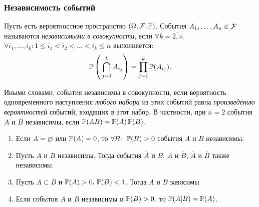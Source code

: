 \subsubsection{Независимость событий}
\begin{defn}
	Пусть есть вероятностное пространство $(\Omega, \mathcal{F}, \operatorname{\mathbb{P}})$. 
	События $A_1, \ldots, A_n \in \mathcal{F}$ называются \textit{независимыми в совокупности}, если 
	$\forall k = \overline{2, n}$ $\forall i_{1}, \ldots, i_{k} \colon 1 \leqslant i_1 < i_2 < \ldots < i_k \leqslant n$ выполняется:
	\begin{equation*}
		\operatorname{\mathbb{P}}\left(\, \bigcap\limits_{j=1}^k A_{i_j}\right) = \prod\limits_{j=1}^k \operatorname{\mathbb{P}}(A_{i_j}).
	\end{equation*}
	
	Иными словами, события независимы в совокупности, если вероятность одновременного наступления \textit{любого набора} из этих событий равна \textit{произведению вероятностей} событий, входящих в этот набор. 
	В частности, при $n = 2$ события $A$ и $B$ независимы, если $\operatorname{\mathbb{P}}(AB) = \operatorname{\mathbb{P}}(A)\operatorname{\mathbb{P}}(B)$.
\end{defn}

\begin{namedthm}\leavevmode
	\begin{enumerate}
		\item 
		      Если $A = \varnothing$ или $\operatorname{\mathbb{P}}(A) = 0$, то $\forall B \colon \operatorname{\mathbb{P}}(B) > 0$ события $A$ и $B$ независимы.
		\item 
		      Пусть $A$ и $B$ независимы. Тогда события $\overline{A}$ и $B$, $A$ и $\overline{B}$, $\overline{A}$ и $\overline{B}$ также независимы. 
		\item 
		      Пусть $A \subset B$ и $\operatorname{\mathbb{P}}(A) > 0, \, \operatorname{\mathbb{P}}(B) < 1$. Тогда $A$ и $B$ зависимы. 
		\item 
		      Если события $A$ и $B$ независимы и $\operatorname{\mathbb{P}}(B) > 0$, то $\operatorname{\mathbb{P}}(A|B) = \operatorname{\mathbb{P}}(A)$.
	\end{enumerate}
\end{namedthm}

